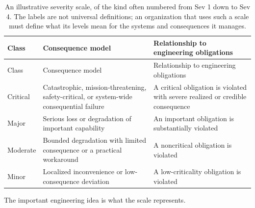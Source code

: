 \begin{longtable}[]{@{}
  >{\raggedright\arraybackslash}p{}
  >{\raggedright\arraybackslash}p{}
  >{\raggedright\arraybackslash}p{}@{}}
\caption{An illustrative severity scale, of the kind often numbered from Sev 1 down to Sev 4. The labels
are not universal definitions; an organization that uses such a scale must define what its levels
mean for the systems and consequences it manages.}\label{tbl-severity-scale}\tabularnewline
\toprule\noalign{}
\begin{minipage}[b]{\linewidth}\raggedright
Class
\end{minipage} & \begin{minipage}[b]{\linewidth}\raggedright
Consequence model
\end{minipage} & \begin{minipage}[b]{\linewidth}\raggedright
Relationship to engineering obligations
\end{minipage} \\
\midrule\noalign{}
\endfirsthead
\toprule\noalign{}
\begin{minipage}[b]{\linewidth}\raggedright
Class
\end{minipage} & \begin{minipage}[b]{\linewidth}\raggedright
Consequence model
\end{minipage} & \begin{minipage}[b]{\linewidth}\raggedright
Relationship to engineering obligations
\end{minipage} \\
\midrule\noalign{}
\endhead
\bottomrule\noalign{}
\endlastfoot
Critical & Catastrophic, mission-threatening, safety-critical, or system-wide consequential failure & A critical obligation is violated with severe realized or credible consequence \\
Major & Serious loss or degradation of important capability & An important obligation is substantially violated \\
Moderate & Bounded degradation with limited consequence or a practical workaround & A noncritical obligation is violated \\
Minor & Localized inconvenience or low-consequence deviation & A low-criticality obligation is violated \\
\end{longtable}

The important engineering idea is what the scale represents.

